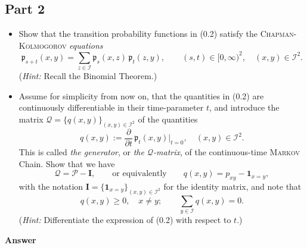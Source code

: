 \documentclass[letterpaper]{article}
\begin{document}
			\subsection{Part 2}
			\begin{itemize}
			\item[(b)] Show that the transition probability functions in (0.2) satisfy the \textsc{Chapman-Kolmogorov} \textit{equations}
			\begin{equation}
				\mathfrak{p}_{s+t}(x,y) = \sum_{z \in \mathcal{I}} \mathfrak{p}_s(x,z)\, \mathfrak{p}_t(z,y), \qquad (s,t) \in [0,\infty)^2, \quad (x,y) \in \mathcal{I}^2. \tag{0.3}
			\end{equation}
			(\textit{Hint:} Recall the Binomial Theorem.)
			
			\item[(c)] Assume for simplicity from now on, that the quantities in (0.2) are continuously differentiable in their time-parameter $t$, and introduce the matrix $\mathcal{Q} = \{q(x,y)\}_{(x,y) \in \mathcal{I}^2}$ of the quantities
			\begin{equation}
				q(x,y) := \frac{\partial}{\partial t}\, \mathfrak{p}_t(x,y)\bigg|_{t=0}, \quad (x,y) \in \mathcal{I}^2. \tag{0.4}
			\end{equation}
			This is called \textit{the generator}, or \textit{the $\mathcal{Q}$-matrix}, of the continuous-time \textsc{Markov} Chain. Show that we have
			\begin{equation}
				\mathcal{Q} = \mathcal{P} - \mathbf{I}, \qquad \text{or equivalently} \qquad q(x,y) = p_{xy} - \mathbf{1}_{x=y}, \tag{0.5}
			\end{equation}
			with the notation $\mathbf{I} = \{\mathbf{1}_{x=y}\}_{(x,y) \in \mathcal{I}^2}$ for the identity matrix, and note that
			\[
			q(x,y) \geq 0, \quad x \neq y; \qquad \sum_{y \in \mathcal{I}} q(x,y) = 0.
			\]
			(\textit{Hint:} Differentiate the expression of (0.2) with respect to $t$.)
			\end{itemize}
		
		\textbf{Answer}
		
		\clearpage
\end{document}
